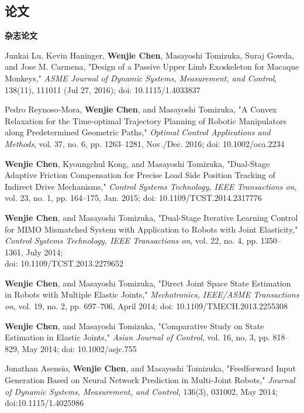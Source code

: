 \documentclass[UTF8,nofonts]{res}
\begin{document}
\begin{resume}
\section{论文}
\vspace{0.1in}
    \textbf{杂志论文} %
    \begin{etaremune}[start=7]
    \item Junkai Lu, Kevin Haninger, \textbf{Wenjie Chen}, Masayoshi Tomizuka, Suraj Gowda, and Jose M. Carmena, "Design of a Passive Upper Limb Exoskeleton for Macaque Monkeys," \emph{ASME Journal of Dynamic Systems, Measurement, and Control}, 138(11), 111011 (Jul 27, 2016); doi: 10.1115/1.4033837
    \item Pedro Reynoso-Mora, \textbf{Wenjie Chen}, and Masayoshi Tomizuka, "A Convex Relaxation for the Time-optimal Trajectory Planning of Robotic Manipulators along Predetermined Geometric Paths," \emph{Optimal Control Applications and Methods}, vol. 37, no. 6, pp. 1263--1281, Nov./Dec. 2016; doi: 10.1002/oca.2234
    \item \textbf{Wenjie Chen}, Kyoungchul Kong, and Masayoshi Tomizuka, "Dual-Stage Adaptive Friction Compensation for Precise Load Side Position Tracking of Indirect Drive Mechanisms," \emph{Control Systems Technology, IEEE Transactions on}, vol. 23, no. 1, pp. 164--175, Jan. 2015;  doi: 10.1109/TCST.2014.2317776
    \item \textbf{Wenjie Chen}, and Masayoshi Tomizuka, "Dual-Stage Iterative Learning Control for MIMO Mismatched System with Application to Robots with Joint Elasticity," \emph{Control Systems Technology, IEEE Transactions on}, vol. 22, no. 4, pp. 1350--1361, July 2014; \\doi: 10.1109/TCST.2013.2279652
    \item \textbf{Wenjie Chen}, and Masayoshi Tomizuka, "Direct Joint Space State Estimation in Robots with Multiple Elastic Joints," \emph{Mechatronics, IEEE/ASME Transactions on}, vol. 19, no. 2, pp. 697--706, April 2014; doi: 10.1109/TMECH.2013.2255308
    \item \textbf{Wenjie Chen}, and Masayoshi Tomizuka, "Comparative Study on State Estimation in Elastic Joints," \emph{Asian Journal of Control}, vol. 16, no. 3, pp. 818--829, May 2014; doi: 10.1002/asjc.755%
    \item Jonathan Asensio, \textbf{Wenjie Chen}, and Masayoshi Tomizuka, "Feedforward Input Generation Based on Neural Network Prediction in Multi-Joint Robots," \emph{Journal of Dynamic Systems, Measurement, and Control}, 136(3), 031002, May 2014;   doi:10.1115/1.4025986
    \end{etaremune}


\end{resume}
\end{document}
